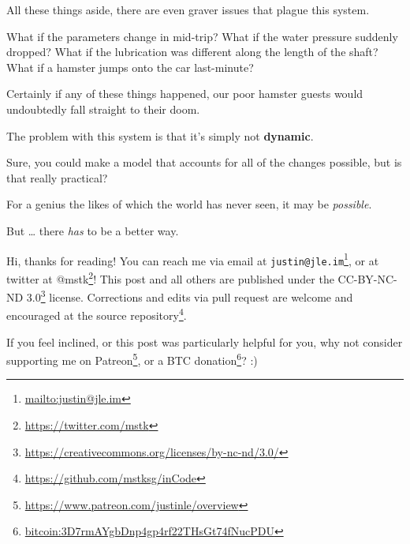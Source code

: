 \documentclass[]{article}
\renewcommand{\href}[2]{#2\footnote{\url{#1}}}
\begin{document}
All these things aside, there are even graver issues that plague this system.

What if the parameters change in mid-trip? What if the water pressure suddenly
dropped? What if the lubrication was different along the length of the shaft?
What if a hamster jumps onto the car last-minute?

Certainly if any of these things happened, our poor hamster guests would
undoubtedly fall straight to their doom.

The problem with this system is that it's simply not \textbf{dynamic}.

Sure, you could make a model that accounts for all of the changes possible, but
is that really practical?

For a genius the likes of which the world has never seen, it may be
\emph{possible}.

But \ldots{} there \emph{has} to be a better way.

Hi, thanks for reading! You can reach me via email at
\href{mailto:justin@jle.im}{\nolinkurl{justin@jle.im}}, or at twitter at
\href{https://twitter.com/mstk}{@mstk}! This post and all others are published
under the \href{https://creativecommons.org/licenses/by-nc-nd/3.0/}{CC-BY-NC-ND
3.0} license. Corrections and edits via pull request are welcome and encouraged
at \href{https://github.com/mstksg/inCode}{the source repository}.

If you feel inclined, or this post was particularly helpful for you, why not
consider \href{https://www.patreon.com/justinle/overview}{supporting me on
Patreon}, or a \href{bitcoin:3D7rmAYgbDnp4gp4rf22THsGt74fNucPDU}{BTC donation}?
:)
\end{document}
